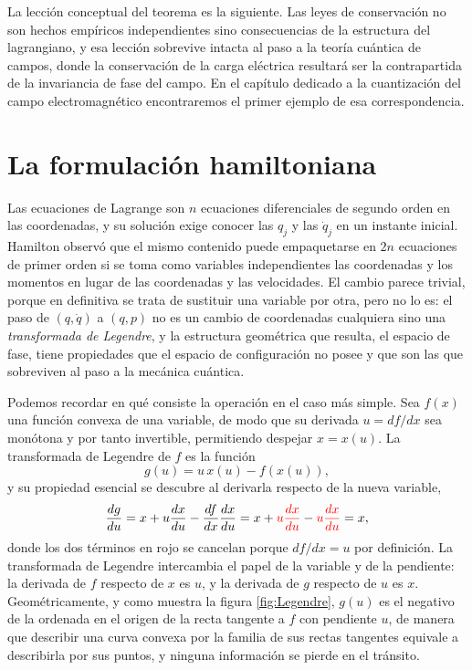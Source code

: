         La lección conceptual del teorema es la siguiente. Las leyes de conservación no son hechos empíricos independientes sino consecuencias de la estructura del lagrangiano, y esa lección sobrevive intacta al paso a la teoría cuántica de campos, donde la conservación de la carga eléctrica resultará ser la contrapartida de la invariancia de fase del campo. En el capítulo dedicado a la cuantización del campo electromagnético encontraremos el primer ejemplo de esa correspondencia.

\section{La formulación hamiltoniana}

        Las ecuaciones de Lagrange son $n$ ecuaciones diferenciales de segundo orden en las coordenadas, y su solución exige conocer las $q_{j}$ y las $\dot{q}_{j}$ en un instante inicial. Hamilton observó que el mismo contenido puede empaquetarse en $2n$ ecuaciones de primer orden si se toma como variables independientes las coordenadas y los momentos en lugar de las coordenadas y las velocidades. El cambio parece trivial, porque en definitiva se trata de sustituir una variable por otra, pero no lo es: el paso de $(q,\dot{q})$ a $(q,p)$ no es un cambio de coordenadas cualquiera sino una \textit{transformada de Legendre}, y la estructura geométrica que resulta, el espacio de fase, tiene propiedades que el espacio de configuración no posee y que son las que sobreviven al paso a la mecánica cuántica.

        Podemos recordar en qué consiste la operación en el caso más simple. Sea $f(x)$ una función convexa de una variable, de modo que su derivada $u = df/dx$ sea monótona y por tanto invertible, permitiendo despejar $x = x(u)$. La transformada de Legendre de $f$ es la función
        \begin{equation}\label{eq:Legendre1D}
            g(u) = u\,x(u) - f\left(x(u)\right),
        \end{equation}
        y su propiedad esencial se descubre al derivarla respecto de la nueva variable,
        \begin{equation}\label{eq:LegendreDerivada}
            \frac{dg}{du} = x + u\frac{dx}{du} - \frac{df}{dx}\frac{dx}{du}
            = x + \textcolor{red}{u\frac{dx}{du}} - \textcolor{red}{u\frac{dx}{du}} = x,
        \end{equation}
        donde los dos términos en rojo se cancelan porque $df/dx = u$ por definición. La transformada de Legendre intercambia el papel de la variable y de la pendiente: la derivada de $f$ respecto de $x$ es $u$, y la derivada de $g$ respecto de $u$ es $x$. Geométricamente, y como muestra la figura \ref{fig:Legendre}, $g(u)$ es el negativo de la ordenada en el origen de la recta tangente a $f$ con pendiente $u$, de manera que describir una curva convexa por la familia de sus rectas tangentes equivale a describirla por sus puntos, y ninguna información se pierde en el tránsito.

